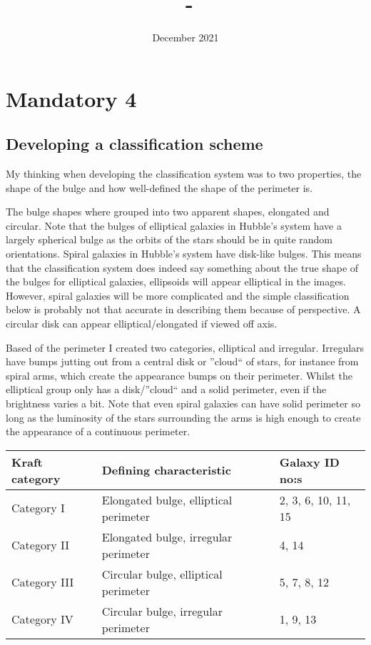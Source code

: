 \documentclass[11pt,a4paper]{article}
\date{December 2021} %
\title{\Foursename\, -\, \Fassignment}
\author{\Fauthor}
\newcommand{\Fassignment}{Mandatory 4} %
\begin{document}
    \section*{\Fassignment}
    \subsection*{Developing a classification scheme}

    My thinking when developing the classification system was to two properties, the shape of the bulge and how well-defined the shape of the perimeter is.

    The bulge shapes where grouped into two apparent shapes, elongated and circular.
    Note that the bulges of elliptical galaxies in Hubble's system have a largely spherical bulge as the orbits of the stars should be in quite random orientations.
    Spiral galaxies in Hubble's system have disk-like bulges.
    This means that the classification system does indeed say something about the true shape of the bulges for elliptical galaxies, ellipsoids will appear elliptical in the images.
    However, spiral galaxies will be more complicated and the simple classification below is probably not that accurate in describing them because of perspective.
    A circular disk can appear elliptical/elongated if viewed off axis.

    Based of the perimeter I created two categories, elliptical and irregular.
    Irregulars have bumps jutting out from a central disk or ''cloud`` of stars, for instance from spiral arms, which create the appearance bumps on their perimeter.
    Whilst the elliptical group only has a disk/''cloud`` and a solid perimeter, even if the brightness varies a bit.
    Note that even spiral galaxies can have solid perimeter so long as the luminosity of the stars surrounding the arms is high enough to create the appearance of a continuous perimeter.


    \begin{table}[h]
        \centering
        \begin{tabular}{lll}
            Kraft category & Defining characteristic              & Galaxy ID no:s      \\ \hline
            Category I   & Elongated bulge, elliptical perimeter & 2, 3, 6, 10, 11, 15 \\ \hline
            Category II  & Elongated bulge, irregular perimeter & 4, 14               \\ \hline
            Category III & Circular bulge, elliptical perimeter  & 5, 7, 8, 12         \\ \hline
            Category IV  & Circular bulge, irregular perimeter   & 1, 9, 13
        \end{tabular}\label{tab:mySystem}
    \end{table}
\end{document}
